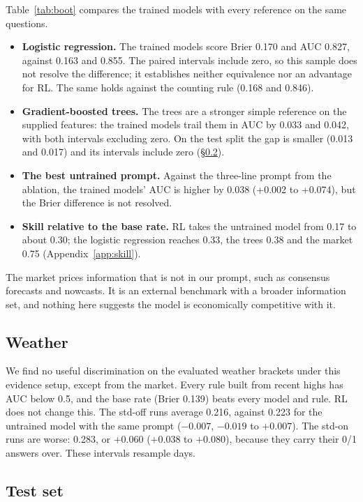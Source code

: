 \documentclass[11pt]{article}
\begin{document}
Table~\ref{tab:boot} compares the trained models with every reference on the same questions.
\begin{itemize}[leftmargin=*]
\item \textbf{Logistic regression.} The trained models score Brier 0.170 and AUC 0.827, against 0.163 and 0.855. The paired intervals include zero, so this sample does not resolve the difference; it establishes neither equivalence nor an advantage for RL. The same holds against the counting rule (0.168 and 0.846).
\item \textbf{Gradient-boosted trees.} The trees are a stronger simple reference on the supplied features: the trained models trail them in AUC by 0.033 and 0.042, with both intervals excluding zero. On the test split the gap is smaller (0.013 and 0.017) and its intervals include zero (\S\ref{sec:test}).
\item \textbf{The best untrained prompt.} Against the three-line prompt from the ablation, the trained models' AUC is higher by 0.038 (+0.002 to +0.074), but the Brier difference is not resolved.
\item \textbf{Skill relative to the base rate.} RL takes the untrained model from 0.17 to about 0.30; the logistic regression reaches 0.33, the trees 0.38 and the market 0.75 (Appendix~\ref{app:skill}).
\end{itemize}
The market prices information that is not in our prompt, such as consensus forecasts and nowcasts. It is an external benchmark with a broader information set, and nothing here suggests the model is economically competitive with it.

\subsection{Weather}
\label{sec:weather}

We find no useful discrimination on the evaluated weather brackets under this evidence setup, except from the market. Every rule built from recent highs has AUC below 0.5, and the base rate (Brier 0.139) beats every model and rule. RL does not change this. The std-off runs average 0.216, against 0.223 for the untrained model with the same prompt ($-0.007$, $-0.019$ to $+0.007$). The std-on runs are worse: 0.283, or $+0.060$ ($+0.038$ to $+0.080$), because they carry their 0/1 answers over. These intervals resample days.

\subsection{Test set}
\label{sec:test}
\end{document}

